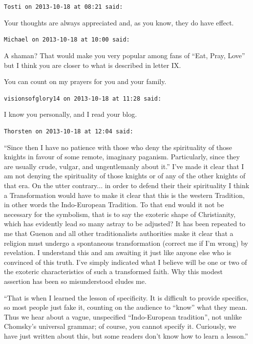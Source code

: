 \begin{footnotesize}
\begin{sffamily}
\hfill

\texttt{Tosti on 2013-10-18 at 08:21 said:}

Your thoughts are always appreciated and, as you know, they do have effect.

\hfill

\texttt{Michael on 2013-10-18 at 10:00 said:}

A shaman? That would make you very popular among fans of ``Eat, Pray, Love'' but I think you are closer to what is described in letter IX.

You can count on my prayers for you and your family.

\hfill

\texttt{visionsofglory14 on 2013-10-18 at 11:28 said:}

I know you personally, and I read your blog.

\hfill

\texttt{Thorsten on 2013-10-18 at 12:04 said:}

``Since then I have no patience with those who deny the spirituality of those knights in favour of some remote, imaginary paganism. Particularly, since they are usually crude, vulgar, and ungentlemanly about it.'' I've made it clear that I am not denying the spirituality of those knights or of any of the other knights of that era. On the utter contrary... in order to defend their their spirituality I think a Transformation would have to make it clear that this is the western Tradition, in other words the Indo-European Tradition. To that end would it not be necessary for the symbolism, that is to say the exoteric shape of Christianity, which has evidently lead so many astray to be adjusted? It has been repeated to me that Guenon and all other traditionalists authorities make it clear that a religion must undergo a spontaneous transformation (correct me if I'm wrong) by revelation. I understand this and am awaiting it just like anyone else who is convinced of this truth. I've simply indicated what I believe will be one or two of the exoteric characteristics of such a transformed faith. Why this modest assertion has been so misunderstood eludes me.

``That is when I learned the lesson of specificity. It is difficult to provide specifics, so most people just fake it, counting on the audience to ``know'' what they mean. Thus we hear about a vague, unspecified ``Indo-European tradition'', not unlike Chomsky's universal grammar; of course, you cannot specify it. Curiously, we have just written about this, but some readers don't know how to learn a lesson.''


\end{sffamily}
\end{footnotesize}
